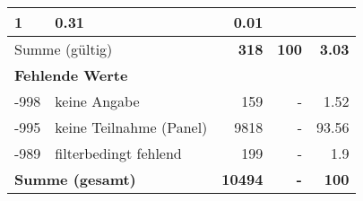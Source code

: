 \begin{longtable}{lXrrr}
       \num{1} &
       \num[round-mode=places,round-precision=2]{0.31} &
         \num[round-mode=places,round-precision=2]{0.01} \\
     \midrule
     \multicolumn{2}{l}{Summe (gültig)} &
       \textbf{\num{318}} &
     \textbf{\num{100}} &
       \textbf{\num[round-mode=places,round-precision=2]{3.03}} \\
     \multicolumn{5}{l}{\textbf{Fehlende Werte}}\\
       -998 &
       keine Angabe &
         \num{159} &
        - &
         \num[round-mode=places,round-precision=2]{1.52} \\
       -995 &
       keine Teilnahme (Panel) &
         \num{9818} &
        - &
         \num[round-mode=places,round-precision=2]{93.56} \\
       -989 &
       filterbedingt fehlend &
         \num{199} &
        - &
         \num[round-mode=places,round-precision=2]{1.9} \\
     \midrule
     \multicolumn{2}{l}{\textbf{Summe (gesamt)}} &
          \textbf{\num{10494}} &
        \textbf{-} &
        \textbf{\num{100}} \\
     \bottomrule
     \end{longtable}
     
